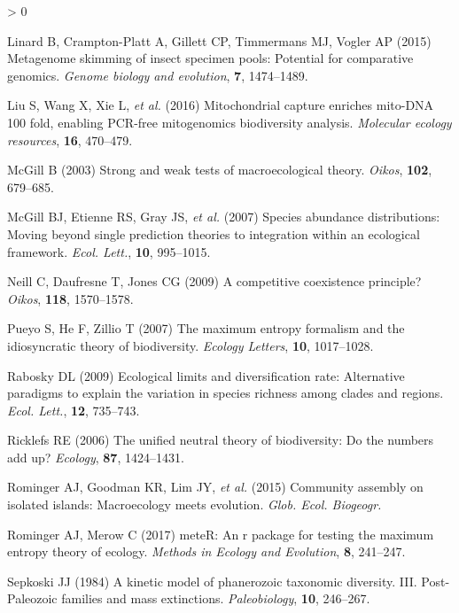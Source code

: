 \documentclass[
]{article}
\newlength{\cslhangindent}
\newenvironment{CSLReferences}[2] %
 {%
  \setlength{\parindent}{0pt}
  \ifodd #1 \everypar{\setlength{\hangindent}{\cslhangindent}}\ignorespaces\fi
  \ifnum #2 > 0
  \setlength{\parskip}{#2\baselineskip}
  \fi
 }%
 {}
\begin{document}
\begin{CSLReferences}{1}{0}
\leavevmode\hypertarget{ref-linard2015}{}%
Linard B, Crampton-Platt A, Gillett CP, Timmermans MJ, Vogler AP (2015)
Metagenome skimming of insect specimen pools: Potential for comparative
genomics. \emph{Genome biology and evolution}, \textbf{7}, 1474--1489.

\leavevmode\hypertarget{ref-liu2016}{}%
Liu S, Wang X, Xie L, \emph{et al.} (2016) Mitochondrial capture
enriches mito-DNA 100 fold, enabling PCR-free mitogenomics biodiversity
analysis. \emph{Molecular ecology resources}, \textbf{16}, 470--479.

\leavevmode\hypertarget{ref-mcgill2003}{}%
McGill B (2003) Strong and weak tests of macroecological theory.
\emph{Oikos}, \textbf{102}, 679--685.

\leavevmode\hypertarget{ref-mcgill2007}{}%
McGill BJ, Etienne RS, Gray JS, \emph{et al.} (2007) Species abundance
distributions: Moving beyond single prediction theories to integration
within an ecological framework. \emph{Ecol. Lett.}, \textbf{10},
995--1015.

\leavevmode\hypertarget{ref-neill2009}{}%
Neill C, Daufresne T, Jones CG (2009) A competitive coexistence
principle? \emph{Oikos}, \textbf{118}, 1570--1578.

\leavevmode\hypertarget{ref-pueyo2007}{}%
Pueyo S, He F, Zillio T (2007) The maximum entropy formalism and the
idiosyncratic theory of biodiversity. \emph{Ecology Letters},
\textbf{10}, 1017--1028.

\leavevmode\hypertarget{ref-rabosky2009}{}%
Rabosky DL (2009) Ecological limits and diversification rate:
Alternative paradigms to explain the variation in species richness among
clades and regions. \emph{Ecol. Lett.}, \textbf{12}, 735--743.

\leavevmode\hypertarget{ref-ricklefs2006}{}%
Ricklefs RE (2006) The unified neutral theory of biodiversity: Do the
numbers add up? \emph{Ecology}, \textbf{87}, 1424--1431.

\leavevmode\hypertarget{ref-rominger2015}{}%
Rominger AJ, Goodman KR, Lim JY, \emph{et al.} (2015) Community assembly
on isolated islands: Macroecology meets evolution. \emph{Glob. Ecol.
Biogeogr.}

\leavevmode\hypertarget{ref-meteR}{}%
Rominger AJ, Merow C (2017) meteR: An r package for testing the maximum
entropy theory of ecology. \emph{Methods in Ecology and Evolution},
\textbf{8}, 241--247.

\leavevmode\hypertarget{ref-sepkoski1984}{}%
Sepkoski JJ (1984) A kinetic model of phanerozoic taxonomic diversity.
{III}. {Post-Paleozoic} families and mass extinctions.
\emph{Paleobiology}, \textbf{10}, 246--267.


\end{CSLReferences}
\end{document}
